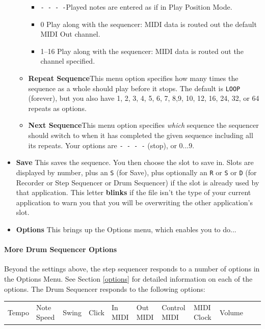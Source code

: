\documentclass{article}
\begin{document}
\begin{itemize}
\begin{itemize}
 \renewcommand\labelitemiii{$\diamond$}
\begin{itemize}
	\item {\texttt{-~-~-~-}}\quad Played notes are entered as if in Play Position Mode.
	\item {0} \quad Play along with the sequencer: MIDI data is routed out the default MIDI Out channel.
	\item {1--16} \quad Play along with the sequencer: MIDI data is routed out the channel specified.
\end{itemize}

\item {\bf Repeat Sequence}\quad This menu option specifies how many times the sequence as a whole should play before it stops.  The default is {\tt LOOP} (forever), but you also have 1, 2, 3, 4, 5, 6, 7, 8,9, 10, 12, 16, 24, 32, or 64 repeats as options.
\item {\bf Next Sequence}\quad This menu option specifies {\it which} sequence the sequencer should switch to when it has completed the given sequence including all its repeats.  Your options are {\tt - - - -} (stop), or 0...9.
\end{itemize} 

\item {\bf Save} \quad This saves the sequence. You then choose the slot to save in.  Slots are displayed by number, plus an \texttt{S} (for Save), plus optionally an \texttt{R} or \texttt{S} or \texttt{D} (for Recorder or Step Sequencer or Drum Sequencer) if the slot is already used by that application.  This letter {\bf blinks} if the file isn't the type of your current application to warn you that you will be overwriting the other application's slot.

\item {\bf Options} \quad This brings up the Options menu, which enables you to do...
\end{itemize}



\paragraph{More Drum Sequencer Options}

Beyond the settings above, the step sequencer responds to a number of options in the Options Menu.  See Section \ref{options} for detailed information on each of the options.  The Drum Sequencer responds to the following options:


\vspace{1em}
\begin{tabular}{lllllllllll}
Tempo& Note Speed& Swing & Click&
In MIDI& Out MIDI&Control MIDI&MIDI Clock&Volume\\
\end{tabular}
\end{document}
